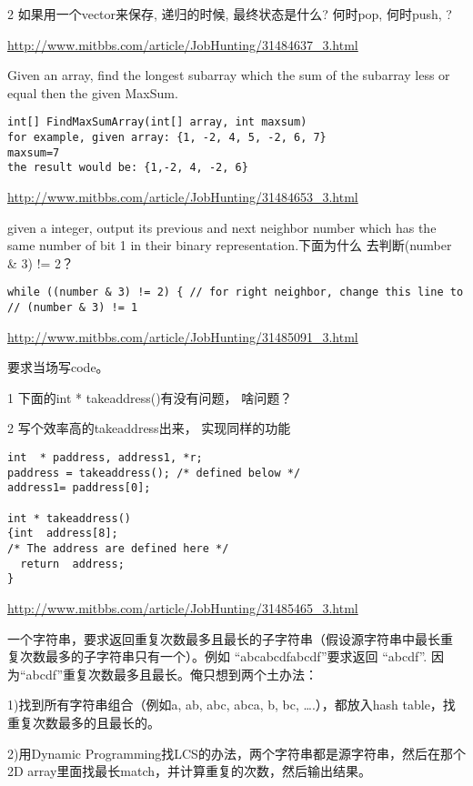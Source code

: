 \documentclass[12pt]{book}
\begin{document}
2 如果用一个vector来保存, 递归的时候, 最终状态是什么? 何时pop, 何时push, ?

\url{http://www.mitbbs.com/article/JobHunting/31484637_3.html}

Given an array, find the longest subarray which the sum of the
subarray less or equal then the given MaxSum.
\lstset{language=java,label= ,caption= ,numbers=none}
\begin{lstlisting}
int[] FindMaxSumArray(int[] array, int maxsum)
for example, given array: {1, -2, 4, 5, -2, 6, 7}
maxsum=7
the result would be: {1,-2, 4, -2, 6}
\end{lstlisting}

\url{http://www.mitbbs.com/article/JobHunting/31484653_3.html}

given a integer, output its previous and next neighbor number which
has the same number of bit 1 in their binary representation.下面为什么
去判断(number \& 3) != 2？
\lstset{language=java,label= ,caption= ,numbers=none}
\begin{lstlisting}
while ((number & 3) != 2) { // for right neighbor, change this line to 
// (number & 3) != 1
\end{lstlisting}

\url{http://www.mitbbs.com/article/JobHunting/31485091_3.html}

要求当场写code。 

1  下面的int * takeaddress()有没有问题， 啥问题？ 

2  写个效率高的takeaddress出来， 实现同样的功能
\lstset{language=java,label= ,caption= ,numbers=none}
\begin{lstlisting}
int  * paddress, address1, *r;
paddress = takeaddress(); /* defined below */
address1= paddress[0];

int * takeaddress()
{int  address[8];
/* The address are defined here */
  return  address;
}
\end{lstlisting}
\url{http://www.mitbbs.com/article/JobHunting/31485465_3.html}

一个字符串，要求返回重复次数最多且最长的子字符串（假设源字符串中最长重
复次数最多的子字符串只有一个）。例如 “abcabcdfabcdf”要求返回
“abcdf”. 因为“abcdf”重复次数最多且最长。俺只想到两个土办法：

1)找到所有字符串组合（例如a, ab, abc, abca, b, bc, \ldots{}.），都放入hash table，找重复次数最多的且最长的。

2)用Dynamic Programming找LCS的办法，两个字符串都是源字符串，然后在那个2D array里面找最长match，并计算重复的次数，然后输出结果。
\end{document}
